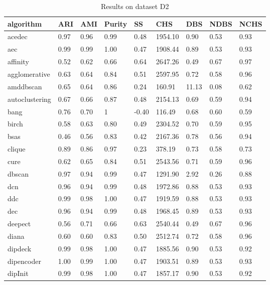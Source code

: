 \begin{table}[H]
\centering
\caption{Results on dataset D2}
\label{S55_Table}
\begin{tabular}{|l|l|l|l|l|l|l|l|l|}
\hline
algorithm & ARI & AMI & Purity & SS & CHS & DBS & NDBS & NCHS \\
\hline
acedec & 0.97 & 0.96 & 0.99 & 0.48 & 1954.10 & 0.90 & 0.53 & 0.93 \\
\hline
aec & 0.99 & 0.99 & 1.00 & 0.47 & 1908.44 & 0.89 & 0.53 & 0.93 \\
\hline
affinity & 0.52 & 0.62 & 0.66 & 0.64 & 2647.26 & 0.49 & 0.67 & 0.97 \\
\hline
agglomerative & 0.63 & 0.64 & 0.84 & 0.51 & 2597.95 & 0.72 & 0.58 & 0.96 \\
\hline
amddbscan & 0.65 & 0.64 & 0.86 & 0.24 & 160.91 & 11.13 & 0.08 & 0.62 \\
\hline
autoclustering & 0.67 & 0.66 & 0.87 & 0.48 & 2154.13 & 0.69 & 0.59 & 0.94 \\
\hline
bang & 0.76 & 0.70 & 1 & -0.40 & 116.49 & 0.68 & 0.60 & 0.59 \\
\hline
birch & 0.58 & 0.63 & 0.80 & 0.49 & 2304.52 & 0.70 & 0.59 & 0.95 \\
\hline
bsas & 0.46 & 0.56 & 0.83 & 0.42 & 2167.36 & 0.78 & 0.56 & 0.94 \\
\hline
clique & 0.89 & 0.86 & 0.97 & 0.23 & 378.19 & 0.73 & 0.58 & 0.73 \\
\hline
cure & 0.62 & 0.65 & 0.84 & 0.51 & 2543.56 & 0.71 & 0.59 & 0.96 \\
\hline
dbscan & 0.97 & 0.94 & 0.99 & 0.47 & 1291.90 & 2.92 & 0.26 & 0.88 \\
\hline
dcn & 0.96 & 0.94 & 0.99 & 0.48 & 1972.86 & 0.88 & 0.53 & 0.93 \\
\hline
ddc & 0.99 & 0.98 & 1.00 & 0.47 & 1919.59 & 0.88 & 0.53 & 0.93 \\
\hline
dec & 0.96 & 0.94 & 0.99 & 0.48 & 1968.45 & 0.89 & 0.53 & 0.93 \\
\hline
deepect & 0.56 & 0.71 & 0.66 & 0.63 & 2540.44 & 0.49 & 0.67 & 0.96 \\
\hline
diana & 0.60 & 0.60 & 0.83 & 0.50 & 2512.74 & 0.72 & 0.58 & 0.96 \\
\hline
dipdeck & 0.99 & 0.98 & 1.00 & 0.47 & 1885.56 & 0.90 & 0.53 & 0.92 \\
\hline
dipencoder & 1.00 & 0.99 & 1.00 & 0.47 & 1903.51 & 0.89 & 0.53 & 0.93 \\
\hline
dipInit & 0.99 & 0.98 & 1.00 & 0.47 & 1857.17 & 0.90 & 0.53 & 0.92 \\

\end{tabular}
\end{table}
